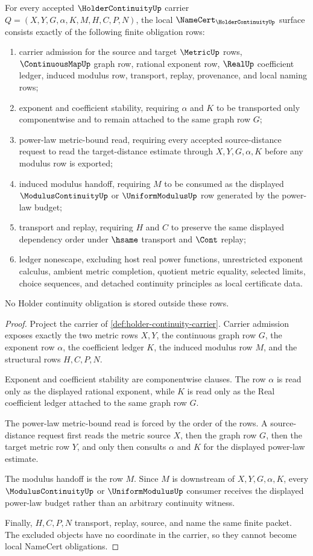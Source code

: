 \begin{theorem}
\label{thm:holder-continuity-namecert-obligations}
For every accepted $\HolderContinuityUp$ carrier $Q=(X,Y,G,\alpha,K,M,H,C,P,N)$, the local $\NameCert_{\HolderContinuityUp}$ surface consists exactly of the following finite obligation rows:
\begin{enumerate}
\item carrier admission for the source and target $\MetricUp$ rows, $\ContinuousMapUp$ graph row, rational exponent row, $\RealUp$ coefficient ledger, induced modulus row, transport, replay, provenance, and local naming rows;
\item exponent and coefficient stability, requiring $\alpha$ and $K$ to be transported only componentwise and to remain attached to the same graph row $G$;
\item power-law metric-bound read, requiring every accepted source-distance request to read the target-distance estimate through $X,Y,G,\alpha,K$ before any modulus row is exported;
\item induced modulus handoff, requiring $M$ to be consumed as the displayed $\ModulusContinuityUp$ or $\UniformModulusUp$ row generated by the power-law budget;
\item transport and replay, requiring $H$ and $C$ to preserve the same displayed dependency order under $\hsame$ transport and $\Cont$ replay;
\item ledger nonescape, excluding host real power functions, unrestricted exponent calculus, ambient metric completion, quotient metric equality, selected limits, choice sequences, and detached continuity principles as local certificate data.
\end{enumerate}
No Holder continuity obligation is stored outside these rows.
\end{theorem}
\begin{proof}
Project the carrier of \autoref{def:holder-continuity-carrier}. Carrier admission exposes exactly the two metric rows $X,Y$, the continuous graph row $G$, the exponent row $\alpha$, the coefficient ledger $K$, the induced modulus row $M$, and the structural rows $H,C,P,N$.

Exponent and coefficient stability are componentwise clauses. The row $\alpha$ is read only as the displayed rational exponent, while $K$ is read only as the Real coefficient ledger attached to the same graph row $G$.

The power-law metric-bound read is forced by the order of the rows. A source-distance request first reads the metric source $X$, then the graph row $G$, then the target metric row $Y$, and only then consults $\alpha$ and $K$ for the displayed power-law estimate.

The modulus handoff is the row $M$. Since $M$ is downstream of $X,Y,G,\alpha,K$, every $\ModulusContinuityUp$ or $\UniformModulusUp$ consumer receives the displayed power-law budget rather than an arbitrary continuity witness.

Finally, $H,C,P,N$ transport, replay, source, and name the same finite packet. The excluded objects have no coordinate in the carrier, so they cannot become local NameCert obligations.
\end{proof}

